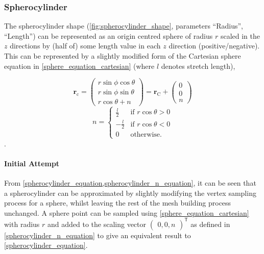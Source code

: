 \subsubsection{Spherocylinder}
\label{spherocylinder_section}
The spherocylinder shape (\cref{fig:spherocylinder_shape}, parameters ``Radius'', ``Length'') can be represented as an origin centred sphere of radius $r$ scaled in the $z$ directions by (half of) some length value in each $z$ direction (positive/negative). This can be represented by a slightly modified form of the Cartesian sphere equation in \cref{sphere_equation_cartesian} (where $l$ denotes stretch length),

\begin{equation}
\mathbf{r}_\mathrm{c}=\begin{pmatrix}r\sin\phi \cos\theta\\
r\sin\phi \sin\theta\\
r\cos\theta + n\end{pmatrix}
=\mathbf{r}_\mathrm{C}+\begin{pmatrix}0\\
0\\
n\end{pmatrix}
\label{spherocylinder_equation}
\end{equation}
\begin{equation}
n=\begin{cases}
  \frac{l}{2}&\text{if } r\cos\theta>0\\
  -\frac{l}{2}&\text{if } r\cos\theta<0\\
  0&\text{otherwise.}
\end{cases}
\label{spherocylinder_n_equation}
\end{equation}.
\paragraph{Initial Attempt}

From \cref{spherocylinder_equation,spherocylinder_n_equation}, it can be seen that a spherocylinder can be approximated by slightly modifying the vertex sampling process for a sphere, whilst leaving the rest of the mesh building process unchanged. A sphere point can be sampled using \cref{sphere_equation_cartesian} with radius $r$ and added to the scaling vector $\begin{pmatrix}0,0,n\end{pmatrix}^\mathsf{T}$ as defined in \cref{spherocylinder_n_equation} to give an equivalent result to \cref{spherocylinder_equation}.

